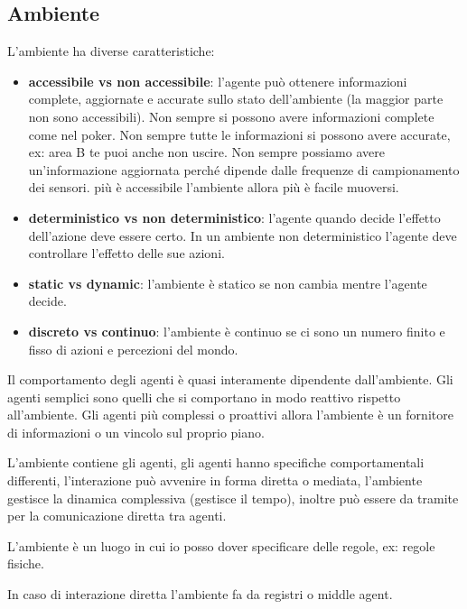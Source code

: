 \subsection{Ambiente}
L'ambiente ha diverse caratteristiche:
\begin{itemize}
    \item \textbf{accessibile vs non accessibile}: l'agente può ottenere informazioni
    complete, aggiornate e accurate sullo stato dell'ambiente (la maggior parte non 
    sono accessibili). Non sempre si possono avere informazioni complete 
    come nel poker. Non sempre tutte le informazioni si possono avere accurate,
    ex: area B te puoi anche non uscire. Non sempre possiamo avere un'informazione 
    aggiornata perché dipende dalle frequenze di campionamento dei sensori. più
    è accessibile l'ambiente allora più è facile muoversi.
    \item \textbf{deterministico vs non deterministico}: l'agente quando decide 
    l'effetto dell'azione deve essere certo. In un ambiente non deterministico 
    l'agente deve controllare l'effetto delle sue azioni.
    \item \textbf{static vs dynamic}: l'ambiente è statico se non cambia mentre 
    l'agente decide.
    \item \textbf{discreto vs continuo}: l'ambiente è continuo se ci sono un numero 
    finito e fisso di azioni e percezioni del mondo.
\end{itemize}

Il comportamento degli agenti è quasi interamente dipendente dall'ambiente. Gli
agenti semplici sono quelli che si comportano in modo reattivo rispetto all'ambiente.
Gli agenti più complessi o proattivi allora l'ambiente è un fornitore di informazioni
o un vincolo sul proprio piano.

L'ambiente contiene gli agenti, gli agenti hanno specifiche comportamentali differenti,
l'interazione può avvenire in forma diretta o mediata, l'ambiente gestisce la dinamica
complessiva (gestisce il tempo), inoltre può essere da tramite per la comunicazione 
diretta tra agenti.

L'ambiente è un luogo in cui io posso dover specificare delle regole, ex: regole 
fisiche.


In caso di interazione diretta l'ambiente fa da registri o middle agent.